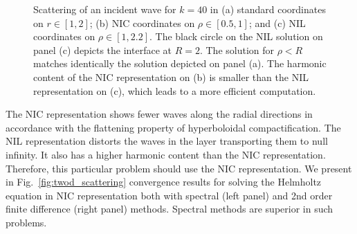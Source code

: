 \documentclass[draft,onefignum,onetabnum]{siamart190516}
\begin{document}
\begin{figure}[ht]
{\begin{minipage}[c][1\width]{
	   0.32\textwidth}
	\end{minipage}}
\caption{Scattering of an incident wave for $k=40$ in (a) standard coordinates on $r\in[1,2]$; (b) NIC coordinates on $\rho\in[0.5,1]$; and (c) NIL coordinates on $\rho\in[1,2.2]$. The black circle on the NIL solution on panel (c) depicts the interface at $R=2$. The solution for $\rho<R$ matches identically the solution depicted on panel (a). The harmonic content of the NIC representation on (b) is smaller than the NIL representation on (c), which leads to a more efficient computation.}
\label{fig:soft_sound}
\end{figure}



The NIC representation shows fewer waves along the radial directions in accordance with the flattening property of hyperboloidal compactification. The NIL representation distorts the waves in the layer transporting them to null infinity. It also has a higher harmonic content than the NIC representation. Therefore, this particular problem should use the NIC representation. We present in Fig.~\ref{fig:twod_scattering} convergence results for solving the Helmholtz equation in NIC representation both with spectral (left panel) and 2nd order finite difference (right panel) methods. Spectral methods are superior in such problems.
\end{document}

